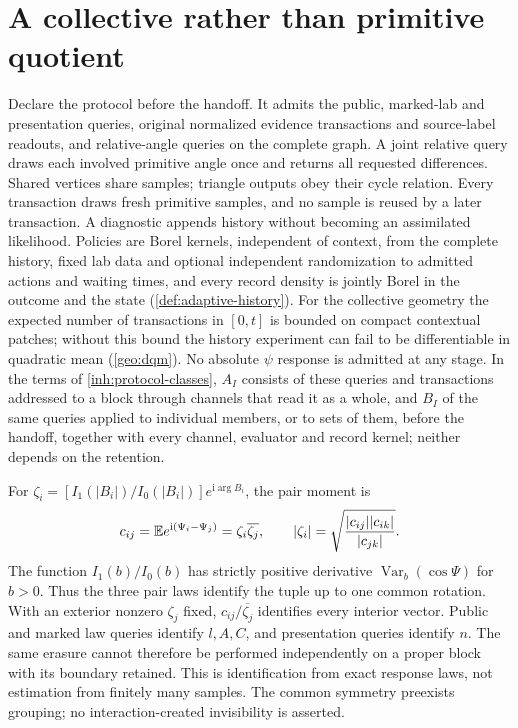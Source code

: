 \section{A collective rather than primitive quotient}
\label{sec:lp-collective}

Declare the protocol before the handoff. It admits the public, marked-lab and presentation queries, original normalized evidence transactions and source-label readouts, and relative-angle queries on the complete graph. A joint relative query draws each involved primitive angle once and returns all requested differences. Shared vertices share samples; triangle outputs obey their cycle relation. Every transaction draws fresh primitive samples, and no sample is reused by a later transaction. A diagnostic appends history without becoming an assimilated likelihood. Policies are Borel kernels, independent of context, from the complete history, fixed lab data and optional independent randomization to admitted actions and waiting times, and every record density is jointly Borel in the outcome and the state (\cref{def:adaptive-history}). For the collective geometry the expected number of transactions in $[0,t]$ is bounded on compact contextual patches; without this bound the history experiment can fail to be differentiable in quadratic mean (\cref{geo:dqm}). No absolute $\psi$ response is admitted at any stage. In the terms of \cref{inh:protocol-classes}, $A_I$ consists of these queries and transactions addressed to a block through channels that read it as a whole, and $B_I$ of the same queries applied to individual members, or to sets of them, before the handoff, together with every channel, evaluator and record kernel; neither depends on the retention.

For $\zeta_i=[I_1(|B_i|)/I_0(|B_i|)]e^{\mathrm i\arg B_i}$, the pair moment is
\begin{equation}
 c_{ij}=\mathbb E e^{\mathrm i(\Psi_i-\Psi_j)}=\zeta_i\overline{\zeta_j},\qquad
 |\zeta_i|=\sqrt{\frac{|c_{ij}||c_{ik}|}{|c_{jk}|}}.
 \label{lp:relative-identification}
\end{equation}
The function $I_1(b)/I_0(b)$ has strictly positive derivative $\operatorname{Var}_b(\cos\Psi)$ for $b>0$. Thus the three pair laws identify the tuple up to one common rotation. With an exterior nonzero $\zeta_j$ fixed, $c_{ij}/\overline{\zeta_j}$ identifies every interior vector. Public and marked law queries identify $l,A,C$, and presentation queries identify $n$. The same erasure cannot therefore be performed independently on a proper block with its boundary retained. This is identification from exact response laws, not estimation from finitely many samples. The common symmetry preexists grouping; no interaction-created invisibility is asserted.


